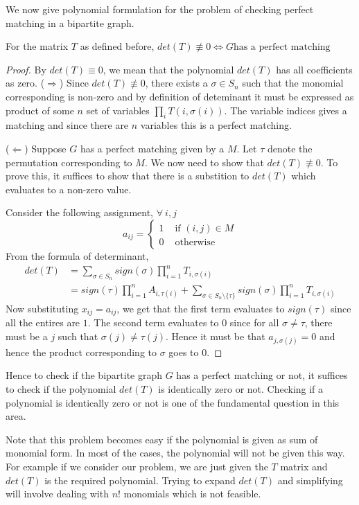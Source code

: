 We now give polynomial formulation for the problem of checking perfect
matching in a bipartite graph.
\begin{claim}
For the matrix $T$ as defined before, $det(T) \not \equiv 0 \iff \text{$G$
has a perfect matching}$
\end{claim}
\begin{proof}
	By $det(T) \equiv 0$, we mean that the polynomial $det(T)$ has all
	coefficients as zero. 
($\Rightarrow$) Since $det(T) \not \equiv 0$, there exists a $\sigma \in S_n$
such that the monomial corresponding is non-zero and by definition of
deteminant it must be expressed as product of some $n$ set of variables
$\prod_i T(i,\sigma(i))$. The variable indices gives a matching and since
there are $n$ variables this is a perfect matching.

($\Leftarrow$) Suppose $G$ has a perfect matching given by a $M$. Let $\tau$ 
denote the permutation corresponding to $M$. We now
need to show that $det(T) \not \equiv 0$. To prove this, it suffices to show
that there is a substition to $det(T)$ which evaluates to a non-zero value. 

Consider the following assignment, $\forall~i,j$ 
\[ a_{ij} = \begin{cases}
		1 & \text{ if } (i,j) \in M \\
		0 & \text{ otherwise}
	\end{cases} 
\]
From the formula of determinant, 
\begin{align*}
	det(T) & = \sum_{\sigma \in S_n} sign(\sigma) \prod_{i=1}^n T_{i,
	\sigma(i)}  \\
	& = sign(\tau)\prod_{i=1}^n A_{i, \tau(i)} + \sum_{\sigma \in S_n
	\setminus \{\tau\}} sign(\sigma)\prod_{i=1}^n T_{i, \sigma(i)}
\end{align*}
Now substituting $x_{ij} = a_{ij}$, we get that the first term evaluates to
$sign(\tau)$ since all the entires are $1$. The second term evaluates to $0$
since for all $\sigma \ne \tau$, there must be a $j$ such that $\sigma(j) \ne
\tau(j)$. Hence it must be that $a_{j, \sigma(j)} = 0$ and hence the product
corresponding to $\sigma$ goes to $0$.
\end{proof}

Hence to check if the bipartite graph $G$ has a perfect matching or not, it
suffices to check if the polynomial $det(T)$ is identically zero or not.
Checking if a polynomial is identically zero or not is one of the fundamental
question in this area.

Note that this problem becomes easy if the polynomial is given as sum of 
monomial form. In most of the cases, the polynomial will not be given this way.
For example if we consider our problem, we are just given the $T$ matrix and
$det(T)$ is the required polynomial. Trying to expand $det(T)$ and simplifying
will involve dealing with $n!$ monomials which is not feasible.

